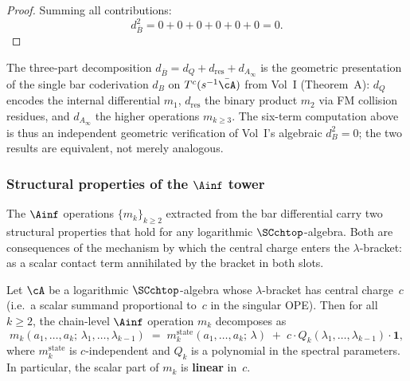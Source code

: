\begin{proof}
Summing all contributions:
\begin{equation}
d_{\overline{B}}^2 = 0 + 0 + 0 + 0 + 0 + 0 = 0.
\end{equation}
\end{proof}

\begin{remark}
\label{rem:bar-differential-vol1-identification}
The three-part decomposition $d_{\overline{B}} = d_Q + d_{\mathrm{res}}
+ d_{A_\infty}$ is the geometric presentation of the single bar
coderivation $d_B$ on $T^c(s^{-1}\bar{\cA})$ from Vol~I
(Theorem~A): $d_Q$ encodes the internal differential $m_1$,
$d_{\mathrm{res}}$ the binary product $m_2$ via FM collision
residues, and $d_{A_\infty}$ the higher operations $m_{k \geq 3}$.
The six-term computation above is thus an independent geometric
verification of Vol~I's algebraic $d_B^2 = 0$; the two results
are equivalent, not merely analogous.
\end{remark}

\subsubsection{Structural properties of the $\Ainf$ tower}

The $\Ainf$ operations $\{m_k\}_{k \ge 2}$ extracted from the
bar differential carry two structural properties that hold for
any logarithmic $\SCchtop$-algebra. Both are consequences of
the mechanism by which the central charge enters the $\lambda$-bracket:
as a scalar contact term annihilated by the bracket in both slots.

\begin{proposition}
\label{prop:c-linearity-general}
Let\/ $\cA$ be a logarithmic $\SCchtop$-algebra whose
$\lambda$-bracket has central charge~$c$
\textup{(}i.e.\ a scalar summand proportional to~$c$
in the singular OPE\textup{)}. Then for all $k \ge 2$, the
chain-level $\Ainf$ operation $m_k$ decomposes as
\[
m_k(a_1, \ldots, a_k;\, \lambda_1, \ldots, \lambda_{k-1})
\;=\;
m_k^{\mathrm{state}}(a_1, \ldots, a_k;\, \lambda)
\;+\;
c \cdot Q_k(\lambda_1, \ldots, \lambda_{k-1})\cdot\mathbf{1},
\]
where $m_k^{\mathrm{state}}$ is $c$-independent and
$Q_k$ is a polynomial in the spectral parameters. In particular,
the scalar part of $m_k$ is \textbf{linear} in~$c$.
\end{proposition}

